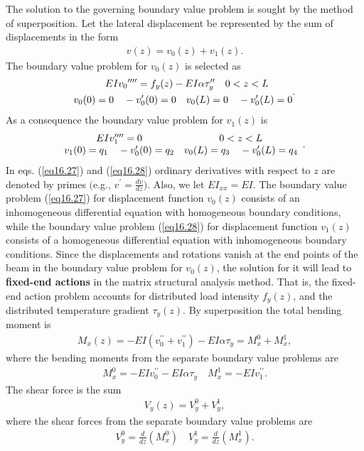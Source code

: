 \documentclass{AeroStructure-ERJohnson}
\begin{document}
The solution to the governing boundary value problem is sought by the method of superposition. Let the lateral displacement be represented by the sum of displacements in the form
\begin{align}\label{eq16.26}
v(z)=v_{0}(z)+v_{1}(z).
\end{align}
The boundary value problem for $v_{0}(z)$ is selected as
\begin{gather}\label{eq16.27}
\begin{split}E I v_{0}{ }^{\prime \prime \prime \prime}=f_{y}(z)-E I \alpha \tau_{y}^{\prime \prime} \quad 0<z<L\hspace*{2pc} \\
v_{0}(0)=0 \quad-v_{0}^{\prime}(0)=0 \quad v_{0}(L)=0 \quad-v_{0}^{\prime}(L)=0
\end{split}.
\end{gather}
As a consequence the boundary value problem for $v_{1}(z)$ is
\begin{align}\label{eq16.28}
\begin{array}{@{}ccc@{}}E I v_{1}^{\prime \prime \prime\prime}=0 & 0<z<L \\v_{1}(0)=q_{1} \quad-v_{0}^{\prime}(0)=q_{2} & v_{0}(L)=q_{3} \quad-v_{0}^{\prime}(L)=q_{4}\end{array}.
\end{align}
In eqs. (\ref{eq16.27}) and (\ref{eq16.28}) ordinary derivatives with respect to $z$ are denoted by primes $\big($e.g., $v^{\prime}=\frac{d v}{d z}\big)$. Also, we let $E I_{x x}=E I$. The boundary value problem (\ref{eq16.27}) for displacement function $v_{0}(z)$ consists of an inhomogeneous differential equation with homogeneous boundary conditions, while the boundary value problem (\ref{eq16.28}) for displacement function $v_{1}(z)$ consists of a homogeneous differential equation with inhomogeneous boundary conditions. Since the displacements and rotations vanish at the end points of the beam in the boundary value problem for $v_{0}(z)$, the solution for it will lead to \textbf{fixed-end actions} in the matrix structural analysis method. That is, the fixed-end action problem accounts for distributed load intensity $f_{y}(z)$, and the distributed temperature gradient $\tau_{y}(z)$. By superposition the total bending moment is
\begin{align}\label{eq16.29}
M_{x}(z)=-E I\left(v_{0}^{\prime \prime}+v_{1}^{\prime \prime}\right)-E I \alpha \tau_{y}=M_{x}^{0}+M_{x}^{1},
\end{align}
where the bending moments from the separate boundary value problems are
\begin{align}\label{eq16.30}
M_{x}^{0}=-E I v_{0}^{\prime \prime}-E I \alpha \tau_{y} \quad M_{x}^{1}=-E I v_{1}^{\prime \prime}.
\end{align}
The shear force is the sum
\begin{align}\label{eq16.31}
V_{y}(z)=V_{y}^{0}+V_{y}^{1},
\end{align}
where the shear forces from the separate boundary value problems are
\begin{align}\label{eq16.32}
V_{y}^{0}=\frac{d}{d z}\left(M_{x}^{0}\right) \quad V_{y}^{1}=\frac{d}{d z}\left(M_{x}^{1}\right).
\end{align}
\end{document}
